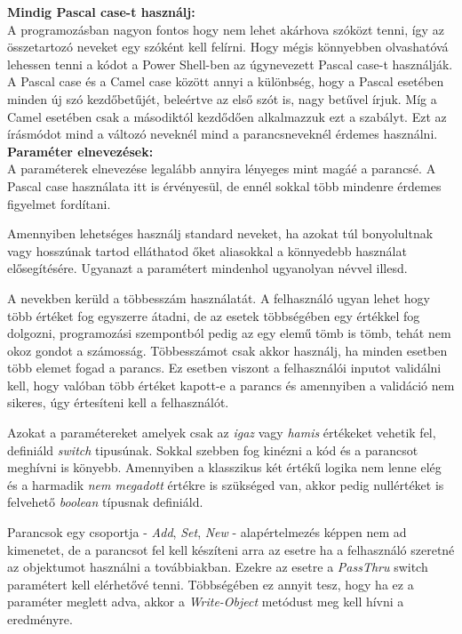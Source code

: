 \documentclass[12pt,oneside,justify,table]{book}
\begin{document}
\noindent \textbf{Mindig Pascal case-t használj:} \\
A programozásban nagyon fontos hogy nem lehet akárhova szóközt tenni, így az összetartozó neveket egy szóként kell felírni. Hogy mégis könnyebben olvashatóvá lehessen tenni a kódot a Power Shell-ben az úgynevezett Pascal case-t használják. A Pascal case és a Camel case között annyi a különbség, hogy a Pascal esetében minden új szó kezdőbetűjét, beleértve az első szót is, nagy betűvel írjuk. Míg a Camel esetében csak a másodiktól kezdődően alkalmazzuk ezt a szabályt. Ezt az írásmódot mind a változó neveknél mind a parancsneveknél érdemes használni. \\

\noindent \textbf{Paraméter elnevezések:} \\
A paraméterek elnevezése legalább annyira lényeges mint magáé a parancsé. A Pascal case használata itt is érvényesül, de ennél sokkal több mindenre érdemes figyelmet fordítani.

Amennyiben lehetséges használj standard neveket, ha azokat túl bonyolultnak vagy hosszúnak tartod elláthatod őket aliasokkal a könnyedebb használat elősegítésére. Ugyanazt a paramétert mindenhol ugyanolyan névvel illesd.

A nevekben kerüld a többesszám használatát. A felhasználó ugyan lehet hogy több értéket fog egyszerre átadni, de az esetek többségében egy értékkel fog dolgozni, programozási szempontból pedig az egy elemű tömb is tömb, tehát nem okoz gondot a számosság. Többesszámot csak akkor használj, ha minden esetben több elemet fogad a parancs. Ez esetben viszont a felhasználói inputot validálni kell, hogy valóban több értéket kapott-e a parancs és amennyiben a validáció nem sikeres, úgy értesíteni kell a felhasználót.

Azokat a paramétereket amelyek csak az \textit{igaz} vagy \textit{hamis} értékeket vehetik fel, definiáld \textit{switch} tipusúnak. Sokkal szebben fog kinézni a kód és a parancsot meghívni is könyebb. Amennyiben a klasszikus két értékű logika nem lenne elég és a harmadik \textit{nem megadott} értékre is szükséged van, akkor pedig nullértéket is felvehető \textit{boolean} típusnak definiáld. 

Parancsok egy csoportja - \textit{Add}, \textit{Set}, \textit{New} - alapértelmezés képpen nem ad kimenetet, de a parancsot fel kell készíteni arra az esetre ha a felhasználó szeretné az objektumot használni a továbbiakban. Ezekre az esetre a \textit{PassThru} switch paramétert kell elérhetővé tenni. Többségében ez annyit tesz, hogy ha ez a paraméter meglett adva, akkor a \textit{Write-Object} metódust meg kell hívni a eredményre. \\
\end{document}
